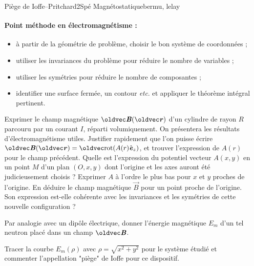 \begin{exercise}{Piège de Ioffe--Pritchard}{2}{Spé}
{Magnétostatique}{bermu, lelay}

\paragraph{Point méthode en électromagnétisme :}
\begin{itemize}
    \item à partir de la géométrie de problème, choisir le bon système de coordonnées ;
    \item utiliser les invariances du problème pour réduire le nombre de variables ;
    \item utiliser les symétries pour réduire le nombre de composantes ;
    \item identifier une surface fermée, un contour \emph{etc.} et appliquer le théorème intégral pertinent.
\end{itemize}


\begin{questions}
    \questioncours Exprimer le champ magnétique $\vB(\vr)$ d'un cylindre de rayon $R$ parcouru par un courant $I$, réparti volumiquement. On présentera les résultats d'électromagnétisme utiles.
    \question Justifier rapidement que l'on puisse écrire $\vB(\vr) = \rot(A(r)\ve_z)$, et trouver l'expression de $A(r)$ pour le champ précédent.
    \question Quelle est l'expression du potentiel vecteur $A(x, y)$ en un point $M$ d'un plan $(O, x, y)$ dont l'origine et les axes auront été judicieusement choisis ?
    \question Exprimer $A$ à l'ordre le plus bas pour $x$ et $y$ proches de l'origine.
    \question En déduire le champ magnétique $\vec{B}$ pour un point proche de l'origine. Son expression est-elle cohérente avec les invariances et les symétries de cette nouvelle configuration ? 
    
    \question Par analogie avec un dipôle électrique, donner l'énergie magnétique $E_m$ d'un tel neutron placé dans un champ $\vB$.
    
    \question Tracer la courbe $E_m(\rho)$ avec $\rho = \sqrt{x^2+y^2}$ pour le système étudié et commenter l'appellation "piège" de Ioffe pour ce dispositif.
\end{questions}


\end{exercise}
